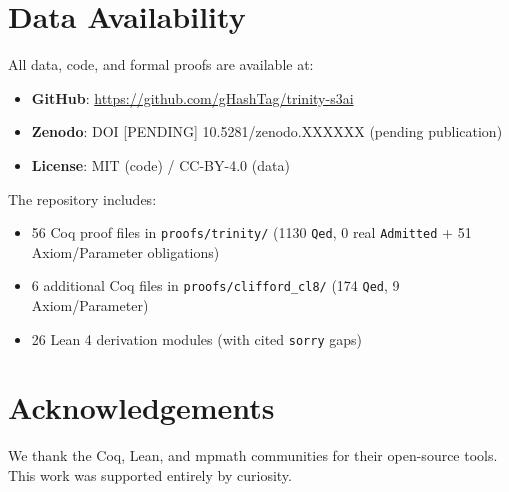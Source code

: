 \documentclass[11pt,a4paper]{article}
\begin{document}
\section{Data Availability}

All data, code, and formal proofs are available at:
\begin{itemize}
  \item \textbf{GitHub}: \url{https://github.com/gHashTag/trinity-s3ai}
  \item \textbf{Zenodo}: DOI [PENDING] 10.5281/zenodo.XXXXXX (pending publication)
  \item \textbf{License}: MIT (code) / CC-BY-4.0 (data)
\end{itemize}

The repository includes:
\begin{itemize}
  \item 56 Coq proof files in \texttt{proofs/trinity/} (1130 \texttt{Qed}, 0 real \texttt{Admitted} + 51 Axiom/Parameter obligations)
  \item 6 additional Coq files in \texttt{proofs/clifford\_cl8/} (174 \texttt{Qed}, 9 Axiom/Parameter)
  \item 26 Lean 4 derivation modules (with cited \texttt{sorry} gaps)
\end{itemize}

\section*{Acknowledgements}

We thank the Coq, Lean, and mpmath communities for their open-source
tools.  This work was supported entirely by curiosity.
\end{document}
